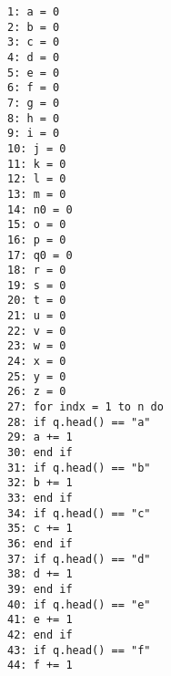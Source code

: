 \documentclass[a4paper]{book}
\theoremstyle{definition}
\begin{document}
\noindent\texttt{1: a = 0 \\
2: b = 0 \\
3: c = 0 \\
4: d = 0 \\
5: e = 0 \\
6: f = 0 \\
7: g = 0 \\
8: h = 0 \\
9: i = 0 \\
10: j = 0 \\
11: k = 0 \\
12: l = 0 \\
13: m = 0 \\
14: n0 = 0 \\
15: o = 0 \\
16: p = 0 \\
17: q0 = 0 \\
18: r = 0 \\
19: s = 0 \\
20: t = 0 \\
21: u = 0 \\
22: v = 0 \\
23: w = 0 \\
24: x = 0 \\
25: y = 0 \\
26: z = 0 \\
27: for indx = 1 to n do \\
28: \indent if q.head() == "a" \\
29: \indent\indent a += 1 \\
30: \indent end if \\
31: \indent if q.head() == "b" \\
32: \indent\indent b += 1 \\
33: \indent end if \\
34: \indent if q.head() == "c" \\
35: \indent\indent c += 1 \\
36: \indent end if \\
37: \indent if q.head() == "d" \\
38: \indent\indent d += 1 \\
39: \indent end if \\
40: \indent if q.head() == "e" \\
41: \indent\indent e += 1 \\
42: \indent end if \\
43: \indent if q.head() == "f" \\
44: \indent\indent f += 1 \\
}
\end{document}
